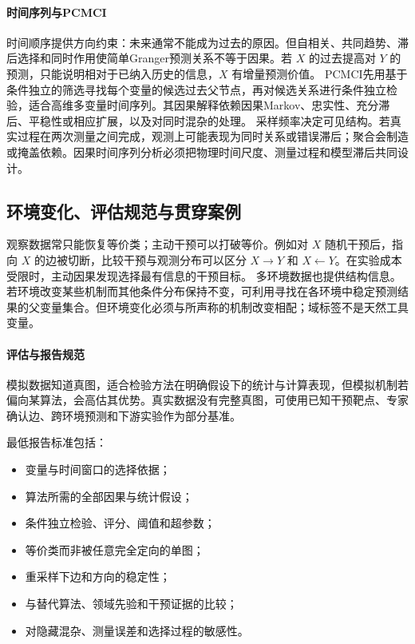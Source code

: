 \paragraph{时间序列与PCMCI}

时间顺序提供方向约束：未来通常不能成为过去的原因。但自相关、共同趋势、滞后选择和同时作用使简单Granger预测关系不等于因果。若 $X$ 的过去提高对 $Y$ 的预测，只能说明相对于已纳入历史的信息，$X$ 有增量预测价值。
PCMCI先用基于条件独立的筛选寻找每个变量的候选过去父节点，再对候选关系进行条件独立检验，适合高维多变量时间序列\parencite{runge2019}。其因果解释依赖因果Markov、忠实性、充分滞后、平稳性或相应扩展，以及对同时混杂的处理。
采样频率决定可见结构。若真实过程在两次测量之间完成，观测上可能表现为同时关系或错误滞后；聚合会制造或掩盖依赖。因果时间序列分析必须把物理时间尺度、测量过程和模型滞后共同设计。

\subsection{环境变化、评估规范与贯穿案例}

观察数据常只能恢复等价类；主动干预可以打破等价。例如对 $X$ 随机干预后，指向 $X$ 的边被切断，比较干预与观测分布可以区分 $X\rightarrow Y$ 和 $X\leftarrow Y$。在实验成本受限时，主动因果发现选择最有信息的干预目标。
多环境数据也提供结构信息。若环境改变某些机制而其他条件分布保持不变，可利用寻找在各环境中稳定预测结果的父变量集合\parencite{peters2016}。但环境变化必须与所声称的机制改变相配；域标签不是天然工具变量。

\paragraph{评估与报告规范}

模拟数据知道真图，适合检验方法在明确假设下的统计与计算表现，但模拟机制若偏向某算法，会高估其优势。真实数据没有完整真图，可使用已知干预靶点、专家确认边、跨环境预测和下游实验作为部分基准。

最低报告标准包括：

\begin{itemize}
  \item 变量与时间窗口的选择依据；
  \item 算法所需的全部因果与统计假设；
  \item 条件独立检验、评分、阈值和超参数；
  \item 等价类而非被任意完全定向的单图；
  \item 重采样下边和方向的稳定性；
  \item 与替代算法、领域先验和干预证据的比较；
  \item 对隐藏混杂、测量误差和选择过程的敏感性。
\end{itemize}

